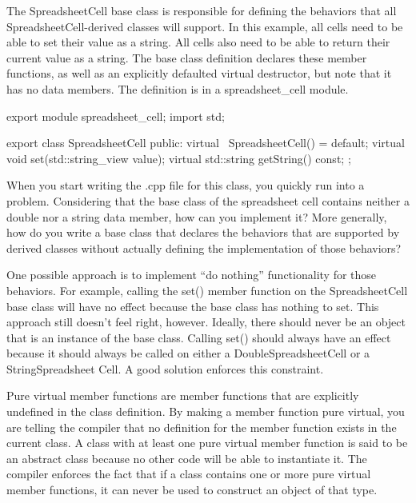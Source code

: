 
The SpreadsheetCell base class is responsible for defining the behaviors that all SpreadsheetCell-derived classes will support. In this example, all cells need to be able to set their value as a string. All cells also need to be able to return their current value as a string. The base class definition declares these member functions, as well as an explicitly defaulted virtual destructor, but note that it has no data members. The definition is in a spreadsheet\_cell module.

\begin{cpp}
export module spreadsheet_cell;
import std;

export class SpreadsheetCell
{
    public:
        virtual ~SpreadsheetCell() = default;
        virtual void set(std::string_view value);
        virtual std::string getString() const;
};
\end{cpp}

When you start writing the .cpp file for this class, you quickly run into a problem. Considering that the base class of the spreadsheet cell contains neither a double nor a string data member, how can you implement it? More generally, how do you write a base class that declares the behaviors that are supported by derived classes without actually defining the implementation of those behaviors?

One possible approach is to implement “do nothing” functionality for those behaviors. For example, calling the set() member function on the SpreadsheetCell base class will have no effect because the base class has nothing to set. This approach still doesn’t feel right, however. Ideally, there should never be an object that is an instance of the base class. Calling set() should always have an effect because it should always be called on either a DoubleSpreadsheetCell or a StringSpreadsheet Cell. A good solution enforces this constraint.


Pure virtual member functions are member functions that are explicitly undefined in the class definition. By making a member function pure virtual, you are telling the compiler that no definition for the member function exists in the current class. A class with at least one pure virtual member function is said to be an abstract class because no other code will be able to instantiate it. The compiler enforces the fact that if a class contains one or more pure virtual member functions, it can never be used to construct an object of that type.

